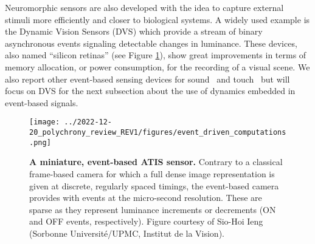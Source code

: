 \documentclass[brainsci, %
               review,submit,pdftex,moreauthors
               ]{Definitions/mdpi}
\begin{document}
Neuromorphic sensors are also developed with the idea to capture external stimuli more efficiently and closer to biological systems. A widely used example is the Dynamic Vision Sensors (DVS) which provide a stream of binary asynchronous events signaling detectable changes in luminance. These devices, also named ``silicon retinas'' (see Figure \ref{fig:silicon_retina}), show great improvements in terms of memory allocation, or power consumption, for the recording of a visual scene. We also report other event-based sensing devices for sound~\citep{chan_aer_2007} and touch~\citep{haessig_event-based_2020} but will focus on DVS for the next subsection about the use of dynamics embedded in event-based signals. 

\begin{figure}[H]
  \centering
\texttt{[image: ../2022-12-20\_polychrony\_review\_REV1/figures/event\_driven\_computations.png]}
\caption{\textbf{A miniature, event-based ATIS sensor.} Contrary to a classical frame-based camera for which a full dense image representation is given at discrete, regularly spaced timings, the event-based camera provides with events at the micro-second resolution. These are sparse as they represent luminance increments or decrements (ON and OFF events, respectively). Figure courtesy of Sio-Hoi Ieng (Sorbonne Université/UPMC, Institut de la Vision).}\label{fig:silicon_retina}
\end{figure}
%

%
\end{document}
